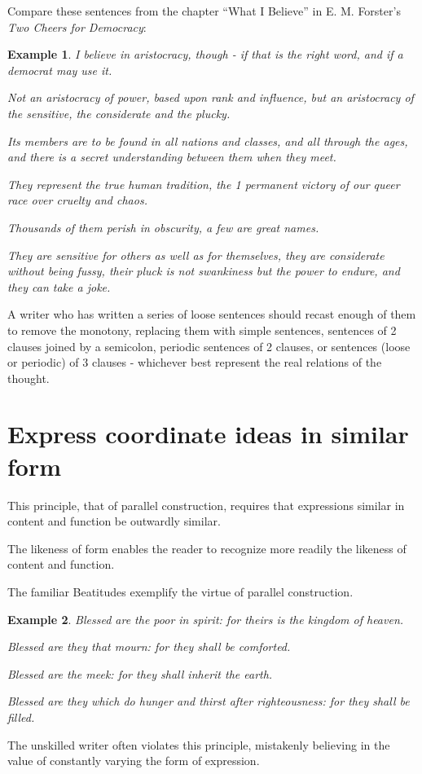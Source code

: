 \documentclass{book}
\numberwithin{equation}{section}
\newtheorem{example}{Example}[chapter]
\begin{document}
Compare these sentences from the chapter ``What I Believe'' in E. M. Forster's \textit{Two Cheers for Democracy}:
\begin{example}
    I believe in aristocracy, though - if that is the right word, and if a democrat may use it.
    
    Not an aristocracy of power, based upon rank and influence, but an aristocracy of the sensitive, the considerate and the plucky.
    
    Its members are to be found in all nations and classes, and all through the ages, and there is a secret understanding between them when they meet.
    
    They represent the true human tradition, the 1 permanent victory of our queer race over cruelty and chaos.
    
    Thousands of them perish in obscurity, a few are great names.
    
    They are sensitive for others as well as for themselves, they are considerate without being fussy, their pluck is not swankiness but the power to endure, and they can take a joke.
\end{example}
A writer who has written a series of loose sentences should recast enough of them to remove the monotony, replacing them with simple sentences, sentences of 2 clauses joined by a semicolon, periodic sentences of 2 clauses, or sentences (loose or periodic) of 3 clauses - whichever best represent the real relations of the thought.

\section{Express coordinate ideas in similar form}
This principle, that of parallel construction, requires that expressions similar in content and function be outwardly similar.

The likeness of form enables the reader to recognize more readily the likeness of content and function.

The familiar Beatitudes exemplify the virtue of parallel construction.
\begin{example}
    Blessed are the poor in spirit: for theirs is the kingdom of heaven.
    
    Blessed are they that mourn: for they shall be comforted.
    
    Blessed are the meek: for they shall inherit the earth.
    
    Blessed are they which do hunger and thirst after righteousness: for they shall be filled.
\end{example}
The unskilled writer often violates this principle, mistakenly believing in the value of constantly varying the form of expression.
\end{document}
